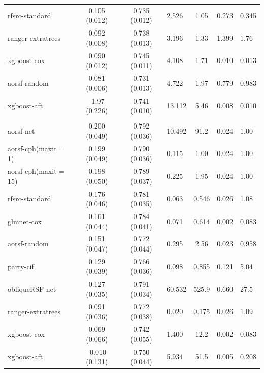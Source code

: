 \documentclass[twoside,11pt]{article}\usepackage[]{graphicx}\usepackage[]{color}
\newenvironment{knitrout}{}{} %
\begin{document}
\begin{knitrout}
\begin{longtable}{lcclccl}
\hspace{1em}rfsrc-standard & 0.105 (0.012) & 0.735 (0.012) & 2.526 & 1.05 & 0.273 & 0.345\\
\hspace{1em}ranger-extratrees & 0.092 (0.008) & 0.738 (0.013) & 3.196 & 1.33 & 1.399 & 1.76\\
\hspace{1em}xgboost-cox & 0.090 (0.012) & 0.745 (0.011) & 4.108 & 1.71 & 0.010 & 0.013\\
\hspace{1em}aorsf-random & 0.081 (0.006) & 0.731 (0.013) & 4.722 & 1.97 & 0.779 & 0.983\\
\hspace{1em}xgboost-aft & -1.97 (0.226) & 0.741 (0.010) & 13.112 & 5.46 & 0.008 & 0.010\\
\addlinespace[0.3em]
\hline
\multicolumn{7}{l}{\textit{\textbf{VA lung cancer trial; death, n = 137, p = 8}}}\\
\hline
\hspace{1em}aorsf-net & 0.200 (0.049) & 0.792 (0.036) & 10.492 & 91.2 & 0.024 & 1.00\\
\hspace{1em}aorsf-cph(maxit = 1) & 0.199 (0.049) & 0.790 (0.036) & 0.115 & 1.00 & 0.024 & 1.00\\
\hspace{1em}aorsf-cph(maxit = 15) & 0.198 (0.050) & 0.789 (0.037) & 0.225 & 1.95 & 0.024 & 1.00\\
\hspace{1em}rfsrc-standard & 0.176 (0.046) & 0.781 (0.035) & 0.063 & 0.546 & 0.026 & 1.08\\
\hspace{1em}glmnet-cox & 0.161 (0.044) & 0.784 (0.041) & 0.071 & 0.614 & 0.002 & 0.083\\
\hspace{1em}aorsf-random & 0.151 (0.047) & 0.772 (0.044) & 0.295 & 2.56 & 0.023 & 0.958\\
\hspace{1em}party-cif & 0.129 (0.039) & 0.766 (0.036) & 0.098 & 0.855 & 0.121 & 5.04\\
\hspace{1em}obliqueRSF-net & 0.127 (0.035) & 0.791 (0.034) & 60.532 & 525.9 & 0.660 & 27.5\\
\hspace{1em}ranger-extratrees & 0.091 (0.036) & 0.772 (0.038) & 0.020 & 0.175 & 0.026 & 1.09\\
\hspace{1em}xgboost-cox & 0.069 (0.066) & 0.742 (0.055) & 1.400 & 12.2 & 0.002 & 0.083\\
\hspace{1em}xgboost-aft & -0.010 (0.131) & 0.750 (0.044) & 5.934 & 51.5 & 0.005 & 0.208\\*
\end{longtable}

\end{knitrout}


\vskip 0.2in

\end{document}
